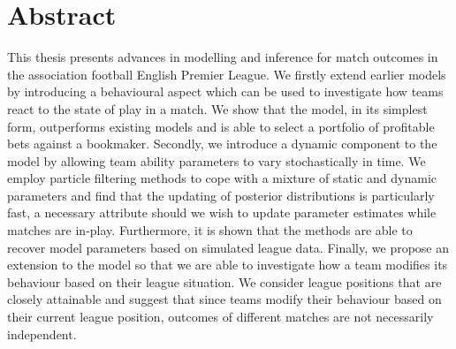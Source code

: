 
\singlespacing
\chapter*{Abstract}
\onehalfspacing

This thesis presents advances in modelling and inference for match outcomes in the association football English Premier
League. We firstly extend earlier models by introducing a behavioural aspect which can be used to investigate how teams
react to the state of play in a match. We show that the model, in its simplest form, outperforms existing models and is
able to select a portfolio of profitable bets against a bookmaker. Secondly, we introduce a dynamic component to the
model by allowing team ability parameters to vary stochastically in time. We employ particle filtering methods to cope
with a mixture of static and dynamic parameters and find that the updating of posterior distributions is particularly
fast, a necessary attribute should we wish to update parameter estimates while matches are in-play. Furthermore, it is
shown that the methods are able to recover model parameters based on simulated league data. Finally, we propose an
extension to the model so that we are able to investigate how a team modifies its behaviour based on their league
situation. We consider league positions that are closely attainable and suggest that since teams modify their behaviour
based on their current league position, outcomes of different matches are not necessarily independent.
 
